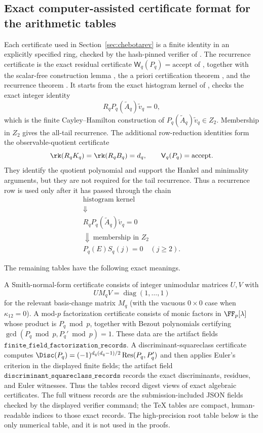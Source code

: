 ﻿\subsection{Exact computer-assisted certificate format for the arithmetic tables}

Each certificate used in Section~\ref{sec:chebotarev} is a finite identity in
an explicitly specified ring, checked by the hash-pinned verifier of
.  The recurrence certificate is
the exact residual certificate \(\mathsf W_q(P_q)=\mathrm{accept}\) of
, together with the scalar-free construction
lemma , the a priori certification theorem
, and the recurrence theorem
.  It starts from the exact
histogram kernel of , checks the exact integer
identity
\[
  R_qP_q(\widetilde A_q)\widetilde v_q=0,
\]
which is the finite Cayley--Hamilton construction of
\(P_q(\widetilde A_q)\widetilde v_q\in Z_2\).  Membership in \(Z_2\) gives the
all-tail recurrence.  The additional row-reduction identities form the
observable-quotient certificate
\[
  \rk(R_qK_q)=\rk(R_qB_q)=d_q,
  \qquad
  \mathsf V_q(P_q)=\mathrm{accept}.
\]
They identify the quotient polynomial and support the Hankel and minimality
arguments, but they are not required for the tail recurrence.
Thus a recurrence row is used only after it has passed through the chain
\[
  \begin{array}{c}
  \text{histogram kernel}\\
  \Downarrow\\
  R_qP_q(\widetilde A_q)\widetilde v_q=0\\
  \Downarrow\ \text{membership in }Z_2\\
  P_q(E)S_q(j)=0\quad(j\ge2).
  \end{array}
\]

The remaining tables have the following exact meanings.

A Smith-normal-form certificate consists of integer unimodular matrices \(U,V\)
with
\[
  U M_q V=\operatorname{diag}(1,\dots,1)
\]
for the relevant basis-change matrix \(M_q\) (with the vacuous \(0\times0\)
case when \(\kappa_{12}=0\)).  A mod-\(p\) factorization certificate consists
of monic factors in \(\FF_p[\lambda]\) whose product is \(P_q\bmod p\), together
with Bezout polynomials certifying
\(\gcd(P_q\bmod p,P_q'\bmod p)=1\).  These data are the artifact fields
\(\texttt{finite\_field\_factorization\_records}\).  A
discriminant-squareclass certificate computes
\(\Disc(P_q)=(-1)^{d_q(d_q-1)/2}\operatorname{Res}(P_q,P_q')\) and then applies
Euler's criterion in the displayed finite fields; the artifact field
\(\texttt{discriminant\_squareclass\_records}\) records the exact
discriminants, residues, and Euler witnesses.  Thus the tables record digest
views of exact algebraic certificates.  The full witness records are the
submission-included JSON fields checked by the displayed verifier command; the
TeX tables are compact, human-readable indices to those exact records.  The
high-precision root table below is the only numerical table, and it is not used
in the proofs.

